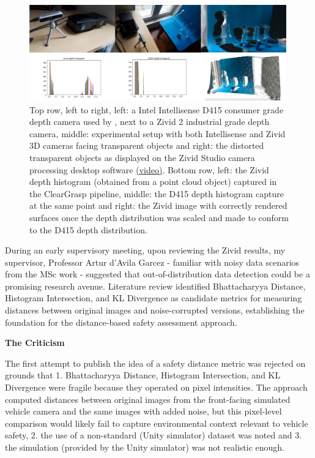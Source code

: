 \begin{figure}[h]
\centering
\includegraphics[width=0.99\textwidth]{Figures/Methods/cleargrasp-D415-Zivid-pipeline-2rows.png}
\caption{Top row, left to right, left: a Intel Intellisense D415 consumer grade depth camera used by \cite{sajjan2019cleargrasp3dshapeestimation}, next to a Zivid 2 industrial grade depth camera, middle: experimental setup with both Intellisense and Zivid 3D cameras facing transparent objects and right: the distorted transparent objects as displayed on the Zivid Studio camera processing desktop software \href{https://www.youtube.com/watch?v=eltQ_hvpcFs}{(video)}. Bottom row, left: the Zivid depth histogram (obtained from a point cloud object) captured in the ClearGrasp pipeline, middle: the D415 depth histogram capture at the same point and right: the Zivid image with correctly rendered surfaces once the depth distribution was scaled and made to conform to the D415 depth distribution.}
\label{fig:cleargrasp-D415-Zivid-pipeline-2rows}
\end{figure}

During an early supervisory meeting, upon reviewing the Zivid results, my supervisor, Professor Artur d'Avila Garcez - familiar with noisy data scenarios from the MSc work - suggested that out-of-distribution data detection could be a promising research avenue. Literature review identified Bhattacharyya Distance, Histogram Intersection, and KL Divergence as candidate metrics for measuring distances between original images and noise-corrupted versions, establishing the foundation for the distance-based safety assessment approach.

\textbf{The Criticism}

The first attempt to publish the idea of a safety distance metric was rejected on grounds that 1. Bhattacharyya Distance, Histogram Intersection, and KL Divergence were fragile because they operated on pixel intensities. The approach computed distances between original images from the front-facing simulated vehicle camera and the same images with added noise, but this pixel-level comparison would likely fail to capture environmental context relevant to vehicle safety, 2. the use of a non-standard (Unity simulator) dataset was noted and 3. the simulation (provided by the Unity simulator) was not realistic enough.

